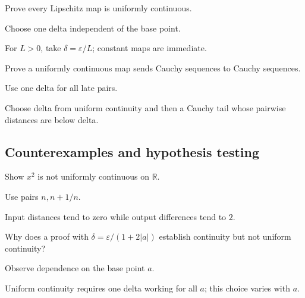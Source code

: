 \begin{exercise}\label{exr:ii05-expand-08}
Prove every Lipschitz map is uniformly continuous.
\end{exercise}
\begin{hint}
Choose one delta independent of the base point.
\end{hint}
\begin{solution}
For \(L>0\), take \(\delta=\varepsilon/L\); constant maps are immediate.
\end{solution}

\begin{exercise}\label{exr:ii05-expand-09}
Prove a uniformly continuous map sends Cauchy sequences to Cauchy sequences.
\end{exercise}
\begin{hint}
Use one delta for all late pairs.
\end{hint}
\begin{solution}
Choose delta from uniform continuity and then a Cauchy tail whose pairwise distances are below delta.
\end{solution}

\subsection*{Counterexamples and hypothesis testing}

\begin{exercise}\label{exr:ii05-expand-10}
Show \(x^2\) is not uniformly continuous on \(\mathbb R\).
\end{exercise}
\begin{hint}
Use pairs \(n,n+1/n\).
\end{hint}
\begin{solution}
Input distances tend to zero while output differences tend to \(2\).
\end{solution}

\begin{exercise}\label{exr:ii05-expand-11}
Why does a proof with \(\delta=\varepsilon/(1+2|a|)\) establish continuity but not uniform continuity?
\end{exercise}
\begin{hint}
Observe dependence on the base point \(a\).
\end{hint}
\begin{solution}
Uniform continuity requires one delta working for all \(a\); this choice varies with \(a\).
\end{solution}

